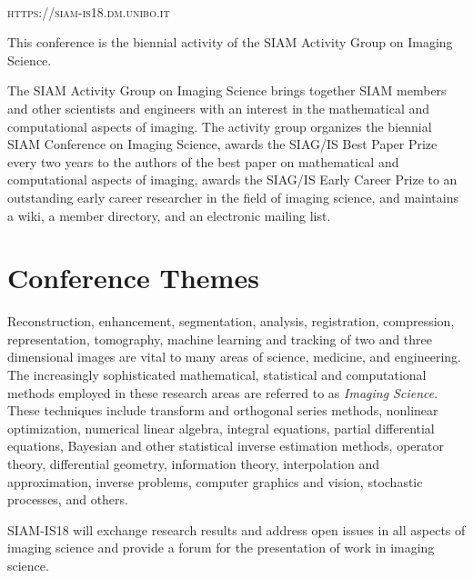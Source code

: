 
\newpage
~\vfill
\thispagestyle{empty}

\noindent \textsc{https://siam-is18.dm.unibo.it}

\bigskip

\noindent This conference is the biennial activity of the SIAM Activity Group on Imaging Science.

\vspace{0.5cm}

\noindent The SIAM Activity Group on Imaging Science brings together SIAM members and other scientists and engineers with an interest 
in the mathematical and computational aspects of imaging.
The activity group organizes the biennial SIAM Conference on Imaging Science, awards the SIAG/IS Best Paper Prize
every two years to the authors of the best paper on mathematical and computational aspects of imaging, awards the SIAG/IS 
Early Career Prize to an outstanding early career researcher in the field of imaging science, and maintains a wiki, a
member directory, and an electronic mailing list.

\newpage

\section*{Conference Themes}

Reconstruction, enhancement, segmentation, analysis, registration, compression, representation, tomography, machine learning and tracking of two and three dimensional images are vital to many areas of science, medicine, and engineering. The increasingly sophisticated mathematical, statistical and computational methods employed in these research areas are referred to as \emph{Imaging Science}.\\ 
These techniques include transform and orthogonal series methods, nonlinear optimization, numerical linear algebra, integral equations, partial differential equations, Bayesian and other statistical inverse estimation methods, operator theory, differential geometry, information theory, interpolation and approximation, inverse problems, computer graphics and vision, stochastic processes, and others.

\smallskip

SIAM-IS18 will exchange research results and address open issues in all aspects of imaging science
and provide a forum for the presentation of work in imaging science.


